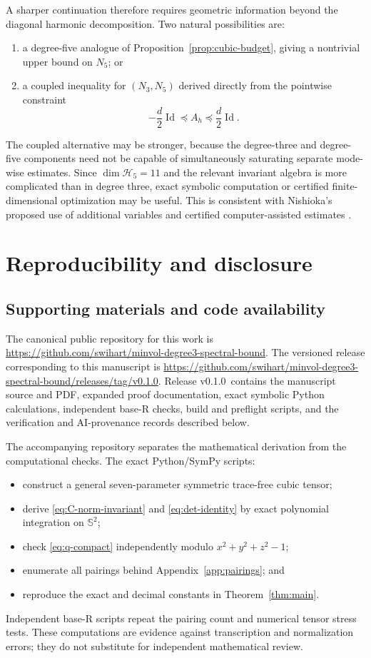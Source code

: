 \documentclass[11pt,reqno]{amsart}
\theoremstyle{remark}
\newcommand{\Sph}{\mathbb S^2}
\newcommand{\Harm}{\mathcal H}
\newcommand{\Id}{\operatorname{Id}}
\newcommand{\releaseversion}{v0.1.0}
\begin{document}
A sharper continuation therefore requires geometric information beyond the
diagonal harmonic decomposition. Two natural possibilities are:
\begin{enumerate}[label=(\roman*),leftmargin=2em]
 \item a degree-five analogue of Proposition~\ref{prop:cubic-budget}, giving a
 nontrivial upper bound on $N_5$; or
 \item a coupled inequality for $(N_3,N_5)$ derived directly from the
 pointwise constraint
 \[
  -\frac d2\Id\preceq A_h\preceq\frac d2\Id.
 \]
\end{enumerate}
The coupled alternative may be stronger, because the degree-three and
degree-five components need not be capable of simultaneously saturating
separate mode-wise estimates. Since $\dim\Harm_5=11$ and the relevant invariant
algebra is more complicated than in degree three, exact symbolic computation
or certified finite-dimensional optimization may be useful. This is consistent
with Nishioka's proposed use of additional variables and certified
computer-assisted estimates \cite{Nishioka2027}.

\section{Reproducibility and disclosure}

\subsection*{Supporting materials and code availability}
The canonical public repository for this work is
\url{https://github.com/swihart/minvol-degree3-spectral-bound}. The versioned
release corresponding to this manuscript is
\url{https://github.com/swihart/minvol-degree3-spectral-bound/releases/tag/v0.1.0}.
Release \releaseversion\ contains the manuscript source and PDF, expanded proof
documentation, exact symbolic Python calculations, independent base-R checks,
build and preflight scripts, and the verification and AI-provenance records
described below.

The accompanying repository separates the mathematical derivation from the
computational checks. The exact Python/SymPy scripts:
\begin{itemize}[leftmargin=2em]
 \item construct a general seven-parameter symmetric trace-free cubic tensor;
 \item derive \eqref{eq:C-norm-invariant} and \eqref{eq:det-identity} by exact
       polynomial integration on $\Sph$;
 \item check \eqref{eq:q-compact} independently modulo
       $x^2+y^2+z^2-1$;
 \item enumerate all pairings behind Appendix~\ref{app:pairings}; and
 \item reproduce the exact and decimal constants in Theorem~\ref{thm:main}.
\end{itemize}
Independent base-R scripts repeat the pairing count and numerical tensor stress
tests. These computations are evidence against transcription and normalization
errors; they do not substitute for independent mathematical review.
\end{document}
